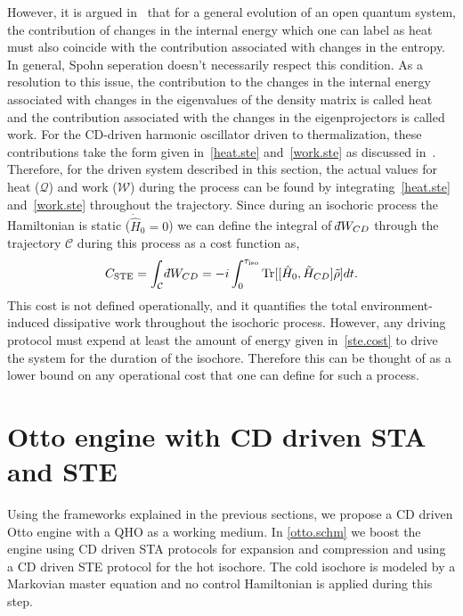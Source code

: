 \documentclass[aps,pra,twocolumn,showpacs,showkeys,groupedaddress,nobalancelastpage,nofootinbib,floatfix,superscriptaddress,longbibliography]{revtex4-2}
\begin{document}
However, it is argued in~\cite{PhysRevA.105.L040201} that for a general evolution of an open quantum system, the contribution of changes in the internal energy which one can label as heat must also coincide with the contribution associated with changes in the entropy. In general, Spohn seperation doesn't necessarily respect this condition. As a resolution to this issue, the contribution to the changes in the internal energy associated with changes in the eigenvalues of the density matrix is called heat and the contribution associated with the changes in the eigenprojectors is called work. For the CD-driven harmonic oscillator driven to thermalization, these contributions take the form given in~\cref{heat.ste} and~\cref{work.ste} as discussed in~\cite{PhysRevA.105.L040201}. Therefore, for the driven system described in this section, the actual values for heat ($\mathcal{Q}$) and work ($\mathcal{W}$) during the process can be found by integrating~\cref{heat.ste} and~\cref{work.ste} throughout the trajectory. Since during an isochoric process the Hamiltonian is static ($\dot{\hat{H}}_0=0$) we can define the integral of $\dbar W_{CD}$ through the trajectory $\mathcal{C}$ during this process as a cost function as,
\begin{equation}\label{ste.cost}
C_{\text{STE}} = \int_{\mathcal{C}} \dbar W_{CD} = -i\int_{0}^{\tau_{\text{iso}}} \text{Tr}[[\hat{H}_0,\tilde{H}_{CD}] \tilde{\rho}]dt.
\end{equation}
This cost is not defined operationally, and it quantifies the total environment-induced dissipative work throughout the isochoric process. However, any driving protocol must expend at least the amount of energy given in~\cref{ste.cost} to drive the system for the duration of the isochore. Therefore this can be thought of as a lower bound on any operational cost that one can define for such a process.

\section{Otto engine with CD driven STA and STE}
\label{sec:otto_sta_ste}
Using the frameworks explained in the previous sections, we propose a CD driven Otto engine with a QHO as a working medium. In \cref{otto.schm} we boost the engine using CD driven STA protocols for expansion and compression and using a CD driven STE protocol for the hot isochore. The cold isochore is modeled by a Markovian master equation and no control Hamiltonian is applied during this step.\\
\end{document}
